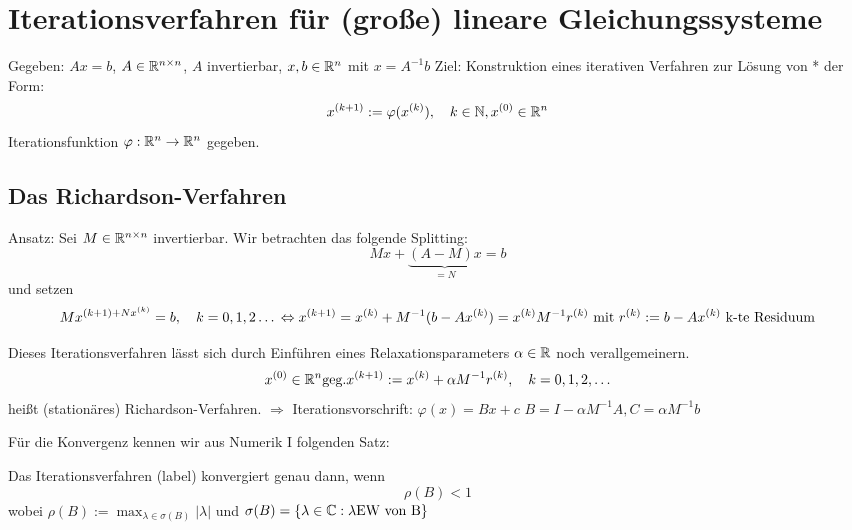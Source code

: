 \chapter{Iterationsverfahren für (große) lineare Gleichungssysteme}
Gegeben: $Ax=b$, $A\in \mathbb{R}^{n\times n}$, $A$ invertierbar, $x,b \in \mathbb{R}^n$ mit $x=A^{-1}b$
Ziel: Konstruktion eines iterativen Verfahren zur Lösung von * der Form:
\begin{equation}
  x^{(k+1)} := \varphi(x^{(k)}),\quad k\in \mathbb{N}, x^{(0)} \in \mathbb{R}^n
  \label{}
\end{equation}
Iterationsfunktion $\varphi: \mathbb{R}^n \to \mathbb{R}^n$ gegeben.

\section{Das Richardson-Verfahren}
Ansatz: Sei $M\in \mathbb{R}^{n\times n}$ invertierbar. Wir betrachten das folgende Splitting:
\begin{equation}
  Mx + \underbrace{(A-M)x}_{=N}= b
  \label{}
\end{equation}
und setzen 
\begin{equation}
  Mx^{(k+1) + Nx^{(k)}} = b,\quad k=0,1,2\dots\\
  \Leftrightarrow x^{(k+1)} = x^{(k)} + M^{-1}(b-Ax^{(k)})
  = x^{(k)} M^{-1}r^{(k)} \text{ mit } r^{(k)} := b-Ax^{(k)} \text{ k-te Residuum} %
  \label{}
\end{equation}

Dieses Iterationsverfahren lässt sich durch Einführen eines Relaxationsparameters $\alpha \in \mathbb{R}$ noch verallgemeinern.
\begin{equation}
  x^{(0)} \in \R^n \text{geg.}
  x^{(k+1)} := x^{(k)} + \alpha M^{-1} r^{(k)},\quad k=0,1,2,\dots
  \label{Iterationsverfahren}
\end{equation}
heißt (stationäres) Richardson-Verfahren. 
$\Rightarrow$ Iterationsvorschrift: $\varphi(x) = Bx + c$ $B=I-\alpha M^{-1}A, C=\alpha M^{-1}b$

Für die Konvergenz kennen wir aus Numerik I folgenden Satz:

\begin{satz}
  \label{itkonvergenz}
  Das Iterationsverfahren (label) konvergiert genau dann, wenn 
  \begin{equation}
    \rho (B) < 1 
    \label{}
  \end{equation}
  wobei $\rho(B) := \max_{\lambda \in \sigma(B)} |\lambda|$ und $\sigma(B) = \left\{ \lambda\in \mathbb{C}: \lambda \text{EW von B} \right\}$
\end{satz}

